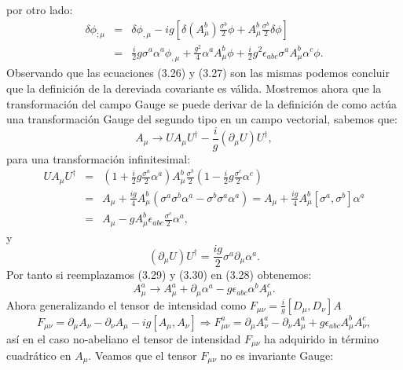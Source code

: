 por otro lado:
\begin{eqnarray}
\nonumber \delta\phi_{;\mu}&=&\delta\phi_{,\mu}-ig[\delta(A_{\mu}^{b})\frac{\sigma^{b}}{2}\phi+A_{\mu}^{b}\frac{\sigma^{b}}{2}\delta\phi]\\
&=&\frac{i}{2}g\sigma^{a}\alpha^{a}\phi_{,\mu}+\frac{g^{2}}{4}\alpha^{a}A_{\mu}^{b}\phi+\frac{i}{2}g^{2}\epsilon_{abc}\sigma^{a}A_{\mu}^{b}\alpha^{c}\phi .
\end{eqnarray}
Observando que las ecuaciones (3.26) y (3.27) son las mismas podemos concluir que la definición de la dereviada covariante es válida. Mostremos ahora que la transformación del campo Gauge se puede derivar de la definición de como actúa una transformación Gauge del segundo tipo en un campo vectorial, sabemos que:
\begin{equation}
A_\mu \to UA_\mu U^\dagger -\frac{i}{g}(\partial_\mu U)U^\dagger ,
\end{equation}
para una transformación infinitesimal:
\begin{eqnarray}
\nonumber UA_\mu U^{\dagger}&=&\left(1+\frac{i}{2}g\frac{\sigma^{a}}{2}\alpha^{a}\right)A_{\mu}^{b}\frac{\sigma^{b}}{2}(1-\frac{i}{2}g\frac{\sigma^{c}}{2}\alpha^{c})\\
\nonumber &=&A_\mu+\frac{ig}{4}A_{\mu}^{b}(\sigma^{a}\sigma^{b}\alpha^{a}-\sigma^{b}\sigma^{a}\alpha^{a})=A_{\mu}+\frac{ig}{4}A_{\mu}^{b}[\sigma^{a},\sigma^{b}]\alpha^{a}\\
&=&A_{\mu}-gA_{\mu}^{b}\epsilon_{abc}\frac{\sigma^{c}}{2}\alpha^{a} ,
\end{eqnarray}
y 
\begin{equation}
(\partial_\mu U)U^\dagger=\frac{ig}{2}\sigma^a\partial_\mu \alpha^a .
\end{equation}
Por tanto si reemplazamos (3.29) y (3.30) en (3.28) obtenemos:
\begin{equation}
A_{\mu}^{a}\to A_{\mu}^{a}+\partial_{\mu}\alpha^{a}-g\epsilon_{abc}\alpha^{b}A_{\mu}^{c}.
\end{equation}
Ahora generalizando el tensor de intensidad como $F_{\mu\nu}=\frac{i}{g}[D_\mu,D_\nu]A$
\begin{equation}
F_{\mu\nu}=\partial_{\mu}A_{\nu}-\partial_{\nu}A_{\mu}-ig[A_{\mu},A_{\nu}]\Rightarrow F_{\mu\nu}^{a}=\partial_{\mu}A_{\nu}^{a}-\partial_{\nu}A_{\mu}^{a}+g\epsilon_{abc}A_{\mu}^{b}A_{\nu}^{c} ,
\end{equation}
así en el caso no-abeliano el tensor de intensidad $F_{\mu\nu}$ ha adquirido in término cuadrático en $A_\mu$. Veamos que el tensor $F_{\mu\nu}$ no es invariante Gauge:
